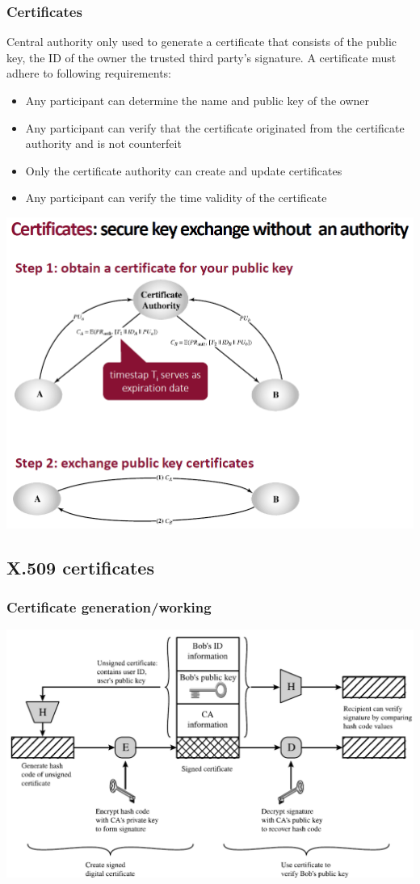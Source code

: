 \documentclass[12pt]{article}
\begin{document}
 \subsubsection{Certificates} 
 Central authority only used to generate a certificate that consists of the public key, the ID of the owner the trusted third party's signature. A certificate must adhere to following requirements:
 \begin{itemize}
 	\item Any participant can determine the name and public key of the owner
 	\item Any participant can verify that the certificate originated from the certificate authority and is not counterfeit
 	\item Only the certificate authority can create and update certificates
 	\item Any participant can verify the time validity of the certificate
 \end{itemize}
\includegraphics[width=0.8\linewidth]{./slides/L5P4CERT.PNG}
 
 \subsection{X.509 certificates}
 
 \subsubsection{Certificate generation/working}
 \includegraphics[width=\linewidth]{./slides/L5P5WORK.PNG}
 
\end{document}
